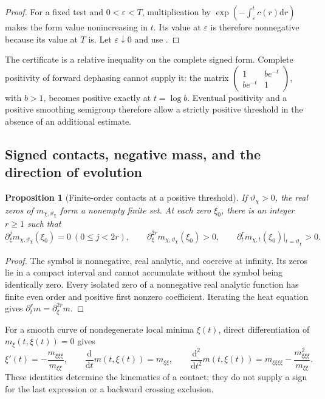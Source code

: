\documentclass[11pt]{article}
\newtheorem{proposition}[theorem]{Proposition}
\theoremstyle{definition}
\theoremstyle{remark}
\newcommand{\dd}{\mathrm d}
\begin{document}
\begin{proof}
For a fixed test and $0<\varepsilon<T$, multiplication by
$\exp(-\int_\varepsilon^tc(r)\dd r)$ makes the form value nonincreasing
in $t$.  Its value at $\varepsilon$ is therefore nonnegative because
its value at $T$ is.  Let $\varepsilon\downarrow0$ and use
.
\end{proof}

The certificate is a relative inequality on the complete signed form.
Complete positivity of forward dephasing cannot supply it: the matrix
$\left(\begin{smallmatrix}1&be^{-t}\\be^{-t}&1\end{smallmatrix}\right)$,
with $b>1$, becomes positive exactly at $t=\log b$.
Eventual positivity and a positive smoothing semigroup therefore allow
a strictly positive threshold in the absence of an additional estimate.

\subsection{Signed contacts, negative mass, and the direction of evolution}

\begin{proposition}[Finite-order contacts at a positive threshold]
\label{prop:gauss-contact}
If $\vartheta_\chi>0$, the real zeros of $m_{\chi,\vartheta_\chi}$
form a nonempty finite set.  At each zero $\xi_0$, there is an integer
$r\ge1$ such that
\begin{equation}
 \partial_\xi^j m_{\chi,\vartheta_\chi}(\xi_0)=0
 \ (0\le j<2r),\qquad
 \partial_\xi^{2r}m_{\chi,\vartheta_\chi}(\xi_0)>0,
 \qquad
 \partial_t^r m_{\chi,t}(\xi_0)|_{t=\vartheta_\chi}>0.
 \label{eq:gauss-contact}
\end{equation}
\end{proposition}

\begin{proof}
The symbol is nonnegative, real analytic, and coercive at infinity.
Its zeros lie in a compact interval and cannot accumulate without the
symbol being identically zero.  Every isolated zero of a nonnegative
real analytic function has finite even order and positive first
nonzero coefficient.  Iterating the heat equation gives
$\partial_t^r m=\partial_\xi^{2r}m$.
\end{proof}

For a smooth curve of nondegenerate local minima $\xi(t)$, direct
differentiation of $m_\xi(t,\xi(t))=0$ gives
\begin{equation}
 \xi'(t)=-\frac{m_{\xi\xi\xi}}{m_{\xi\xi}},\qquad
 \frac{\dd}{\dd t}m(t,\xi(t))=m_{\xi\xi},\qquad
 \frac{\dd^2}{\dd t^2}m(t,\xi(t))
 =m_{\xi\xi\xi\xi}-\frac{m_{\xi\xi\xi}^2}{m_{\xi\xi}}.
 \label{eq:gauss-minimum-motion}
\end{equation}
These identities determine the kinematics of a contact; they do not
supply a sign for the last expression or a backward crossing exclusion.
\end{document}
